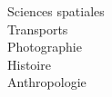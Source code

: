\documentclass[9pt]{developercv} %
\begin{document}
\begin{minipage}[t]{0.18\textwidth}
		Sciences spatiales\\
		Transports \\
		Photographie\\
		Histoire\\
		Anthropologie
\end{minipage}

\end{document}
